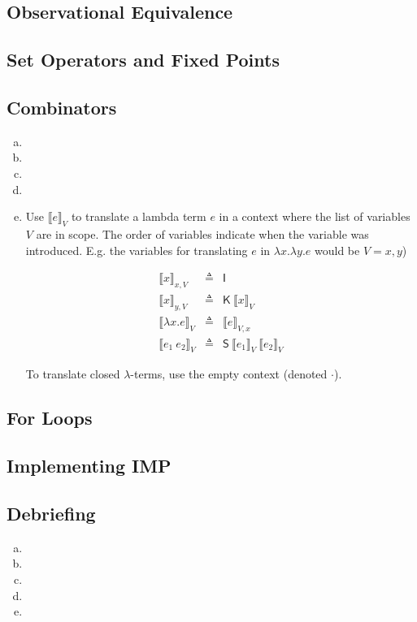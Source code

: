 \documentclass[10pt]{article}
\newcommand{\problem}[1]{\subsection*{\sf #1}}
\newcommand{\translate}[2]{\ensuremath {\llbracket #1 \rrbracket}_{#2}}
\newcommand{\defined}{\triangleq}
\renewcommand{\S}{\textsf{S}}
\newcommand{\K}{\textsf{K}}
\newcommand{\I}{\textsf{I}}
\begin{document}
\problem{1 Observational Equivalence} %
\problem{2 Set Operators and Fixed Points} %
\problem{3 Combinators} %
\begin{enumerate}[(a)]
  \item
  \item
  \item
  \item
  \item


  Use $\translate{e}{V}$ to translate a lambda term $e$ in a context
  where the list of variables $V$ are in scope. The order of variables indicate
  when the variable was introduced. E.g. the variables for translating $e$ in
  $\lambda x. \lambda y. e$ would be $V = x, y$)

  \begin{eqnarray*}
    \translate{x}{x, V}         & \defined & \I                  \\
    \translate{x}{y, V}         & \defined & \K~\translate{x}{V} \\
    \translate{\lambda x. e}{V} & \defined & \translate{e}{V,x}  \\
    \translate{e_1~e_2}{V}      & \defined & \S~\translate{e_1}{V}~\translate{e_2}{V}
  \end{eqnarray*}

  To translate closed $\lambda$-terms, use the empty context (denoted $\cdot$).

\end{enumerate}
\problem{4 For Loops} %
\problem{5 Implementing IMP} %
\problem{6 Debriefing} %
\begin{enumerate}[(a)]
  \item
  \item
  \item
  \item
  \item
\end{enumerate}
\end{document}
